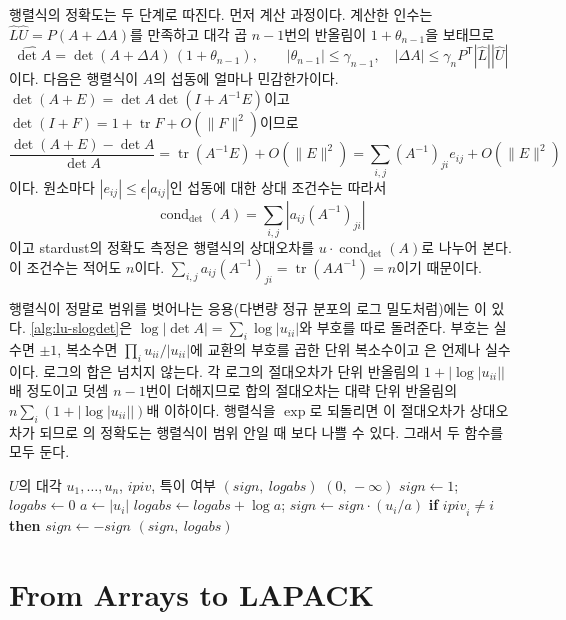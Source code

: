 행렬식의 정확도는 두 단계로 따진다. 먼저 계산 과정이다. 계산한 인수는 $\hat L\hat U=P(A+\Delta A)$를 만족하고 대각 곱 $n-1$번의 반올림이 $1+\theta_{n-1}$을 보태므로
\[
\widehat{\det A}=\det(A+\Delta A)\,(1+\theta_{n-1}),\qquad|\theta_{n-1}|\le\gamma_{n-1},\quad|\Delta A|\le\gamma_nP^{\mathsf T}|\hat L||\hat U|
\]
이다. 다음은 행렬식이 $A$의 섭동에 얼마나 민감한가이다. $\det(A+E)=\det A\det(I+A^{-1}E)$이고 $\det(I+F)=1+\operatorname{tr}F+O(\|F\|^2)$이므로
\[
\frac{\det(A+E)-\det A}{\det A}=\operatorname{tr}(A^{-1}E)+O(\|E\|^2)=\sum_{i,j}(A^{-1})_{ji}e_{ij}+O(\|E\|^2)
\]
이다. 원소마다 $|e_{ij}|\le\epsilon|a_{ij}|$인 섭동에 대한 상대 조건수는 따라서
\[
\operatorname{cond}_{\det}(A)=\sum_{i,j}|a_{ij}(A^{-1})_{ji}|
\]
이고 stardust의 정확도 측정은 행렬식의 상대오차를 $u\cdot\operatorname{cond}_{\det}(A)$로 나누어 본다. 이 조건수는 적어도 $n$이다. $\sum_{i,j}a_{ij}(A^{-1})_{ji}=\operatorname{tr}(AA^{-1})=n$이기 때문이다.

행렬식이 정말로 범위를 벗어나는 응용(다변량 정규 분포의 로그 밀도처럼)에는 이 있다. \cref{alg:lu-slogdet}은 $\log|\det A|=\sum_i\log|u_{ii}|$와 부호를 따로 돌려준다. 부호는 실수면 $\pm1$, 복소수면 $\prod_iu_{ii}/|u_{ii}|$에 교환의 부호를 곱한 단위 복소수이고 은 언제나 실수이다. 로그의 합은 넘치지 않는다. 각 로그의 절대오차가 단위 반올림의 $1+|\log|u_{ii}||$배 정도이고 덧셈 $n-1$번이 더해지므로 합의 절대오차는 대략 단위 반올림의 $n\sum_i(1+|\log|u_{ii}||)$배 이하이다. 행렬식을 $\exp$로 되돌리면 이 절대오차가 상대오차가 되므로 의 정확도는 행렬식이 범위 안일 때 보다 나쁠 수 있다. 그래서 두 함수를 모두 둔다.

\begin{algorithm}[htbp]
\begin{algorithmic}[1]
\Require $U$의 대각 $u_1,\dots,u_n$, $\mathit{ipiv}$, 특이 여부
\Ensure $(\mathit{sign},\ \mathit{logabs})$
 \Return $(0,\,-\infty)$ \EndIf
\State $\mathit{sign}\gets1$; $\mathit{logabs}\gets0$
  \State $a\gets|u_i|$ 
  \State $\mathit{logabs}\gets\mathit{logabs}+\log a$; $\mathit{sign}\gets\mathit{sign}\cdot(u_i/a)$
  \State \textbf{if} $\mathit{ipiv}_i\ne i$ \textbf{then} $\mathit{sign}\gets-\mathit{sign}$
\EndFor
\State \Return $(\mathit{sign},\ \mathit{logabs})$ 
\end{algorithmic}
\caption{부호와 로그 행렬식 (stardust 의 )}
\label{alg:lu-slogdet}
\end{algorithm}
\section{From Arrays to LAPACK}
\label{sec:lu-packing}

